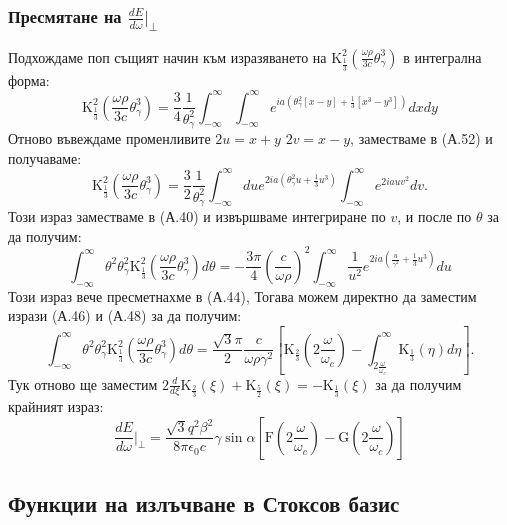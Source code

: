 \begin{appendices}
\subsubsection{Пресмятане на $\frac{dE}{d\omega}\big\vert_\perp$}
Подхождаме поп същият начин към изразяването на  $\text{K}^2_{\frac{1}{3}}\left(\frac{\omega\rho}{3 c}\theta_\gamma^3\right)$ в интегрална форма:
\begin{equation}
	\text{K}^2_{\frac{1}{3}}\left(\frac{\omega\rho}{3 c}\theta_\gamma^3\right) = 	\frac{3}{4}\frac{1}{\theta_\gamma^2}\int_{-\infty}^\infty \int_{-\infty}^\infty e^{ia\left(\theta_\gamma^2[x - y] + \frac{1}{3}[x^3 - y^3]\right)}dxdy
\end{equation}
Отново въвеждаме променливите $2u = x + y$ $2v = x - y$, заместваме в (А.52) и получаваме:
\begin{equation}
	\text{K}^2_{\frac{1}{3}}\left(\frac{\omega\rho}{3 c}\theta_\gamma^3\right) = 	\frac{3}{2}\frac{1}{\theta_\gamma^2}\int_{-\infty}^\infty du e^{2ia\left(\theta_\gamma^2 u + \frac{1}{3}u^3\right)}\int_{-\infty}^{\infty}e^{2iauv^2}dv.
\end{equation}
Този израз заместваме в (А.40) и извършваме интегриране по $v$, и после по $\theta$ за да получим:
\begin{equation}
	\int_{-\infty}^\infty \theta^2\theta_\gamma^2 \text{K}^2_{\frac{1}{3}}\left(\frac{\omega\rho}{3 c}\theta_\gamma^3\right)d\theta = -\frac{3\pi}{4}\left(\frac{c}{\omega\rho}\right)^2\int_{-\infty}^{\infty}\frac{1}{u^2} e^{2ia\left(\frac{u}{\gamma^2}+\frac{1}{3}u^3\right)}du
\end{equation}
Този израз вече пресметнахме в (А.44), Тогава можем директно да заместим изрази (А.46) и (А.48) за да получим:
\begin{equation}
	\int_{-\infty}^\infty \theta^2\theta_\gamma^2 \text{K}^2_{\frac{1}{3}}\left(\frac{\omega\rho}{3 c}\theta_\gamma^3\right)d\theta = \frac{\sqrt{3}\pi}{2}\frac{c}{\omega\rho \gamma^2}\left[\text{K}_{\frac{2}{3}}\left(2\frac{\omega}{\omega_c}\right) - \int_{2\frac{\omega}{\omega_c}}^\infty \text{K}_{\frac{1}{3}}(\eta)d\eta\right].
\end{equation}
Тук отново ще заместим $2\frac{d}{d\xi}\text{K}_{\frac{2}{3}}(\xi) + \text{K}_{\frac{5}{2}}(\xi) = - \text{K}_{\frac{1}{3}}(\xi)$ за да получим крайният израз:
\begin{equation}
	\boxed{\frac{dE}{d\omega}\bigg\vert_\perp = \frac{\sqrt{3}q^2\beta^2}{8\pi\epsilon_0 c}\gamma\sin\alpha\left[\text{F}\left(2\frac{\omega}{\omega_c}\right) - \text{G}\left(2\frac{\omega}{\omega_c}\right)\right]}
\end{equation}
\subsection{Функции на излъчване в Стоксов базис}

\end{appendices}
